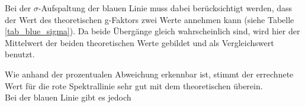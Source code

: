 Bei der  $\sigma$-Aufspaltung der blauen Linie muss dabei berücksichtigt werden, dass der Wert des theoretischen g-Faktors zwei Werte annehmen kann (siehe Tabelle \ref{tab_blue_sigma}). Da beide Übergänge gleich wahrscheinlich sind, wird hier der Mittelwert der beiden theoretischen Werte gebildet und als Vergleichswert benutzt.

Wie anhand der prozentualen Abweichung erkennbar ist, stimmt der errechnete Wert für die rote Spektrallinie sehr gut mit dem theoretischen überein.\\
Bei der blauen Linie gibt es jedoch




